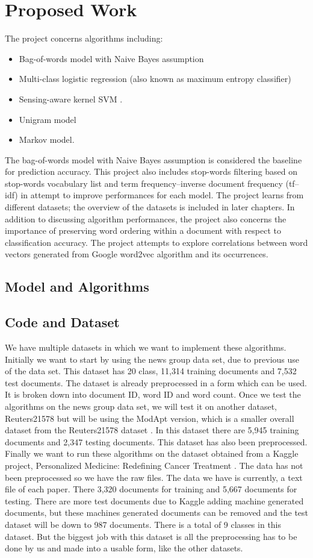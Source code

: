 \documentclass[a4paper, 11pt]{article}
\begin{document}
\section{Proposed Work}
The project concerns algorithms including:
\begin{itemize}
\item Bag-of-words model with Naive Bayes assumption
\item Multi-class logistic regression (also known as maximum entropy classifier)
\item Sensing-aware kernel SVM \cite{ding2014sensing}.
\item Unigram model
\item Markov model.
\end{itemize}
The bag-of-words model with Naive Bayes assumption is considered the baseline for prediction accuracy. This project also includes stop-words filtering based on stop-words vocabulary list and term frequency–inverse document frequency (tf–idf) in attempt to improve performances for each model. The project learns from different datasets; the overview of the datasets is included in later chapters. In addition to discussing algorithm performances, the project also concerns the importance of preserving word ordering within a document with respect to classification accuracy. The project attempts to explore correlations between word vectors generated from Google word2vec algorithm and its occurrences. 
\subsection{Model and Algorithms}

\subsection{Code and Dataset}
We have multiple datasets in which we want to implement these algorithms. Initially we want to start by using the news group data set, due to previous use of the data set. This dataset has 20 class, 11,314 training documents and 7,532 test documents. The dataset is already preprocessed in a form which can be used. It is broken down into document ID, word ID and word count. Once we test the algorithms on the news group data set, we will test it on another dataset, Reuters21578 but will be using the ModApt version, which is a smaller overall dataset from the Reuters21578 dataset \cite{dataset}. In this dataset there are 5,945 training documents and 2,347 testing documents. This dataset has also been preprocessed. Finally we want to run these algorithms on the dataset obtained from a Kaggle project, Personalized Medicine: Redefining Cancer Treatment \cite{kaggledataset}. The data has not been preprocessed so we have the raw files. The data we have is currently, a text file of each paper. There 3,320 documents for training and 5,667 documents for testing. There are more test documents due to Kaggle adding machine generated documents, but these machines generated documents can be removed and the test dataset will be down to 987 documents. There is a total of 9 classes in this dataset. But the biggest job with this dataset is all the preprocessing has to be done by us and made into a usable form, like the other datasets. 
\end{document}
